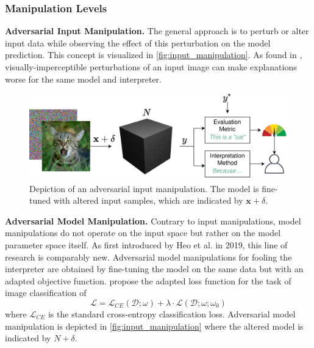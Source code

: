 \subsubsection{Manipulation Levels}
\label{subsubsec:manipulation_levels}
\par\smallskip
\noindent 

\par\smallskip
\noindent\textbf{Adversarial Input Manipulation.} The general approach is to perturb or alter input data while observing the effect of this perturbation on the model prediction. This concept is visualized in \autoref{fig:input_manipulation}. 
As found in \cite{dombrowski2019explanations}, visually-imperceptible perturbations of an input image can make explanations worse for the same model and interpreter. 

\begin{figure}[ht]
    \centering
    \includegraphics[width=\linewidth]{figures/input_manipulations.png}
    \caption{Depiction of an adversarial input manipulation. The model is fine-tuned with altered input samples, which are indicated by $\mathbf{x}+\delta$.}
    \label{fig:input_manipulation}
    \vspace{-0.3cm}
\end{figure}

\par\smallskip
\noindent\textbf{Adversarial Model Manipulation.} 
Contrary to input manipulations, model manipulations do not operate on the input space but rather on the model parameter space itself. 
As first introduced by Heo et al. \cite{fooling_nn_interpreters} in 2019, this line of research is comparably new. 
Adversarial model manipulations for fooling the interpreter are obtained by fine-tuning the model on the same data but with an adapted objective function. \cite{fooling_nn_interpreters} propose the adapted loss function for the task of image classification of $$ \mathcal{L} = \mathcal{L}_{CE}(\mathcal{D};\omega) + \lambda \cdot \mathcal{L}(\mathcal{D};\omega; \omega_0) $$ where $\mathcal{L}_{CE}$ is the standard cross-entropy classification loss. 
Adversarial model manipulation is depicted in \autoref{fig:input_manipulation} where the altered model is indicated by $N+\delta$.

